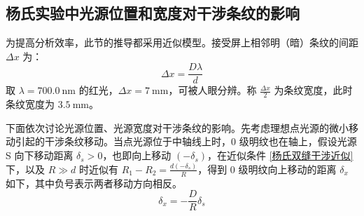 \documentclass[UTF8]{report}
\theoremstyle{MyLineTheoremStyle} %
\theoremstyle{MyBlockTheoremStyle} %
\theoremstyle{MySubsubsectionStyle} %
\begin{document}
\subsection{杨氏实验中光源位置和宽度对干涉条纹的影响}\label{杨氏实验中光源位置和宽度对干涉条纹的影响}

为提高分析效率，此节的推导都采用近似模型。接受屏上相邻明（暗）条纹的间距 $\Delta x$ 为：
\begin{equation}
\Delta x = \frac{D \lambda}{d}
\end{equation}
取 $\lambda = 700.0\ \mathrm{nm}$ 的红光，$\Delta x = 7 \ \mathrm{mm}$，可被人眼分辨。称 $\frac{\Delta x}{2}$ 为条纹宽度，此时条纹宽度为 $3.5\ \mathrm{mm}$。

下面依次讨论光源位置、光源宽度对干涉条纹的影响。先考虑理想点光源的微小移动引起的干涉条纹移动。当点光源位于中轴线上时，0 级明纹也在轴上，假设光源 S 向下移动距离 $ \delta_s > 0$，也即向上移动 $(-\delta_s)$，在近似条件 \ref{杨氏双缝干涉近似} 下，以及 $R \gg d$ 时近似有 $R_1 - R_2 = \frac{d(-\delta_s)}{R}$，得到 0 级明纹向上移动的距离 $\delta_x$ 如下，其中负号表示两者移动方向相反。
\begin{equation}
\delta_x = - \frac{D}{R}\delta_s
\end{equation}
\end{document}
